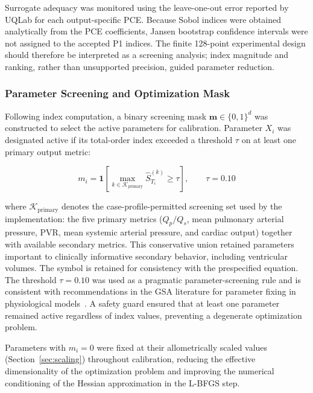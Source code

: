 \documentclass{article}
\begin{document}
Surrogate adequacy was monitored using the leave-one-out error reported by
UQLab for each output-specific PCE. Because Sobol indices were obtained
analytically from the PCE coefficients, Jansen bootstrap confidence intervals
were not assigned to the accepted P1 indices. The finite 128-point experimental
design should therefore be interpreted as a screening analysis; index magnitude
and ranking, rather than unsupported precision, guided parameter reduction.

\subsubsection{Parameter Screening and Optimization Mask}
\label{sec:screening}

Following index computation, a binary screening mask
$\mathbf{m} \in \{0,1\}^d$ was constructed to select the
active parameters for calibration. Parameter $X_i$ was
designated active if its total-order index exceeded a threshold
$\tau$ on at least one primary output metric:

\begin{equation}
    m_i = \mathbf{1}\!\left[
            \max_{k \in \mathcal{K}_\mathrm{primary}}
            \hat{S}_{T_i}^{(k)} \geq \tau
          \right], \qquad \tau = 0.10
    \label{eq:screening_mask}
\end{equation}

\noindent where $\mathcal{K}_\mathrm{primary}$ denotes the case-profile-permitted
screening set used by the implementation: the five primary metrics
($Q_p/Q_s$, mean pulmonary arterial pressure, PVR, mean systemic arterial
pressure, and cardiac output) together with available secondary metrics. This
conservative union retained parameters important to clinically informative
secondary behavior, including ventricular volumes. The symbol is retained for
consistency with the prespecified equation. The threshold $\tau = 0.10$ was used as a
pragmatic parameter-screening rule and is consistent with
recommendations in the GSA literature for parameter fixing in
physiological models~\cite{Saltelli2010}.
A safety guard ensured that at least one parameter remained
active regardless of index values, preventing a degenerate
optimization problem.

Parameters with $m_i = 0$ were fixed at their allometrically
scaled values (Section~\ref{sec:scaling}) throughout calibration,
reducing the effective dimensionality of the optimization
problem and improving the numerical conditioning of the
Hessian approximation in the L-BFGS step.
\end{document}
